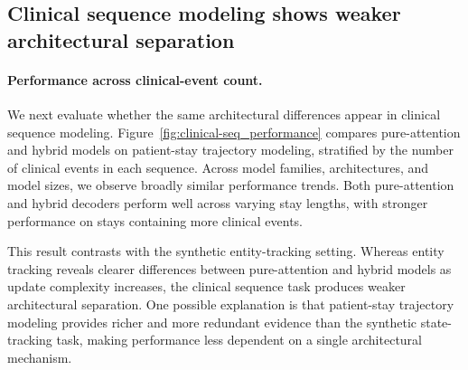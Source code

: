 \documentclass{article}
\begin{document}
\subsection{Clinical sequence modeling shows weaker architectural separation}

\paragraph{Performance across clinical-event count.}
We next evaluate whether the same architectural differences appear in clinical sequence modeling.
Figure~\ref{fig:clinical-seq_performance} compares pure-attention and hybrid models on patient-stay trajectory modeling, stratified by the number of clinical events in each sequence.
Across model families, architectures, and model sizes, we observe broadly similar performance trends.
Both pure-attention and hybrid decoders perform well across varying stay lengths, with stronger performance on stays containing more clinical events.

This result contrasts with the synthetic entity-tracking setting.
Whereas entity tracking reveals clearer differences between pure-attention and hybrid models as update complexity increases, the clinical sequence task produces weaker architectural separation.
One possible explanation is that patient-stay trajectory modeling provides richer and more redundant evidence than the synthetic state-tracking task, making performance less dependent on a single architectural mechanism.
\end{document}
